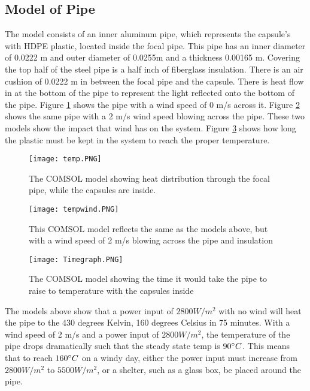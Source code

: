 \documentclass[11pt,english]{article}
\begin{document}
\subsection{Model of Pipe}
The model consists of an inner aluminum pipe, which represents the capsule's with HDPE plastic, located inside the focal pipe. This pipe has an inner diameter of 0.0222 m and outer diameter of 0.0255m and a thickness 0.00165 m. Covering the top half of the steel pipe is a half inch of fiberglass insulation. There is an air cushion of 0.0222 m in between the focal pipe and the capsule. There is heat flow in at the bottom of the pipe to represent the light reflected onto the bottom of the pipe. Figure \ref{fig:COMSOL Heat Flow} shows the pipe with a wind speed of 0 m/s across it. Figure \ref{fig:COMSOL Heat Flow W} shows the same pipe with a 2 m/s wind speed blowing across the pipe. These two models show the impact that wind has on the system. Figure \ref{fig:COMSOL Time} shows how long the plastic must be kept in the system to reach the proper temperature.
\begin{figure}[h!]
\centering
\texttt{[image: temp.PNG]}
\caption{The COMSOL model showing heat distribution through the focal pipe, while the capsules are inside.}
\label{fig:COMSOL Heat Flow}
\end{figure}
\begin{figure}[h!]
\centering
\texttt{[image: tempwind.PNG]}
\caption{This COMSOL model reflects the same as the models above, but with a wind speed of 2 m/s blowing across the pipe and insulation}
\label{fig:COMSOL Heat Flow W}
\end{figure}
\begin{figure}[h!]
\centering
\texttt{[image: Timegraph.PNG]}
\caption{The COMSOL model showing the time it would take the pipe to raise to temperature with the capsules inside}
\label{fig:COMSOL Time}
\end{figure}
The models above show that a power input of $2800 W/m^2$ with no wind will heat the pipe to the 430 degrees Kelvin, 160 degrees Celsius in 75 minutes. With a wind speed of 2 m/s and a power input of $2800 W/m^2$, the temperature of the pipe drops dramatically such that the steady state temp is $90\degree C$. This means that to reach $160\degree C$ on a windy day, either the power input must increase from $2800 W/m^2$ to $5500 W/m^2$, or a shelter, such as a glass box, be placed around the pipe.
\end{document}
